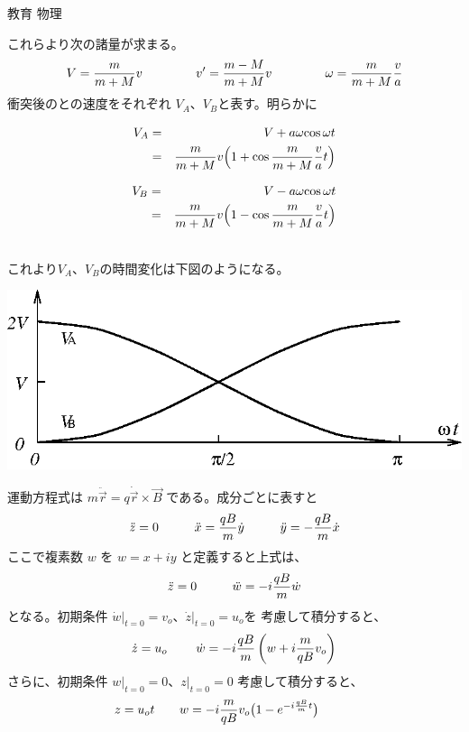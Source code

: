 \documentclass[fleqn]{jbook}
\begin{document}
\begin{answer}{教育 物理}{}
\begin{subanswers}
\begin{subsubanswers}
    これらより次の諸量が求まる。
%
    \[ V=\frac{m}{m+M}v \hspace{15mm} v^\prime=\frac{m-M}{m+M}v \hspace{15mm} \omega=\frac{m}{m+M}\frac{v}{a} \]
%
  \SubSubAnswer
    衝突後の\PA と\PB の速度をそれぞれ $V_A$、$V_B$と表す。明らかに\\
    \parbox{70mm}{
      \begin{eqnarray*}
       V_A &=& V + a\omega{\cos\omega t} \\
           &=& \frac{m}{m+M}v\Bigl(1+\cos{\frac{m}{m+M}\frac{v}{a}t}\Bigr) 
      \end{eqnarray*}
    }
    \parbox{70mm}{
      \begin{eqnarray*}
       V_B &=& V - a\omega{\cos\omega t} \\
           &=& \frac{m}{m+M}v\Bigl(1-\cos{\frac{m}{m+M}\frac{v}{a}t}\Bigr)
      \end{eqnarray*}
    }\\
    これより$V_A$、$V_B$の時間変化は下図のようになる。
%
    \begin{center}
      \mbox{\includegraphics[clip]{1996phys-3.eps}}
    \end{center}
%



  \end{subsubanswers}

\SubAnswer
  \begin{subsubanswers}
  \SubSubAnswer
    運動方程式は $ m \ddot{\Vec{r}} = q \dot{\Vec{r}} \times \Vec{B}$
    である。成分ごとに表すと
%
    \[ \ddot{z} = 0 \hspace{10mm} %
       \ddot{x} = \frac{qB}{m} \dot{y} \hspace{10mm} %
       \ddot{y} = -\frac{qB}{m} \dot{x} \]
%
    ここで複素数 $w$ を $w=x+iy$ と定義すると上式は、
%
    \[ \ddot{z} = 0 \hspace{10mm} %
       \ddot{w} = -i \frac{qB}{m} \dot{w} \]
%
    となる。初期条件 $\dot{w}|_{t=0}=v_o$、$\dot{z}|_{t=0}=u_o$を
    考慮して積分すると、
%
    \[ \dot{z} = u_o \hspace{8mm} %
       \dot{w} = -i \frac{qB}{m} \left( w + i \frac{m}{qB} v_o\right)\]
%
    さらに、初期条件 $w|_{t=0}=0$、$z|_{t=0}=0$ 考慮して積分すると、
%
    \[ z = u_o t \hspace{7mm} %
       w = -i \frac{m}{qB} v_o\bigr( 1-e^{-i\frac{qB}{m}t} \bigl) \hspace{10mm} \]
%


\end{subsubanswers}
\end{subanswers}
\end{answer}
\end{document}

